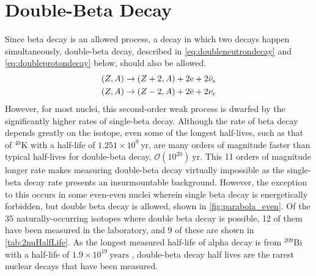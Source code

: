 \section{Double-Beta Decay}
\label{sec:Double Beta Decay}
Since beta decay is an allowed process, a decay in which two decays happen simultaneously, double-beta decay, described in \autoref{eq:doubleneutrondecay} and \autoref{eq:doubleprotondecay} below, should also be allowed.
\begin{align}
    (Z, A) & \rightarrow (Z+2, A)+2\textrm{e}+2\Bar{\nu}_e \label{eq:doubleneutrondecay} \\
    (Z, A) & \rightarrow (Z-2, A)+2\Bar{\textrm{e}}+2\nu_e \label{eq:doubleprotondecay} 
\end{align}
However, for most nuclei, this second-order weak process is dwarfed by the significantly higher rates of single-beta decay.
Although the rate of beta decay depends greatly on the isotope, even some of the longest half-lives, such as that of $^{40}$K with a half-life of $1.251\times10^{9}~\textrm{yr}$, are many orders of magnitude faster than typical half-lives for double-beta decay, $\mathcal{O}(10^{20})~\textrm{yr}$.
This 11 orders of magnitude longer rate makes measuring double-beta decay virtually impossible as the single-beta decay rate presents an insurmountable background.
However, the exception to this occurs in some even-even nuclei wherein single beta decay is energetically forbidden, but double beta decay is allowed, shown in \autoref{fig:parabola_even}.
Of the 35 naturally-occurring isotopes where double beta decay is possible, 12 of them have been measured in the laboratory, and 9 of these are shown in \autoref{tab:2nuHalfLife}.
As the longest measured half-life of alpha decay is from $^{209}\textrm{Bi}$ with a half-life of $1.9 \times 10^{19}~\textrm{years}$ \cite{Marcillac:2003Bi-209detection}, double-beta decay half lives are the rarest nuclear decays that have been measured.
